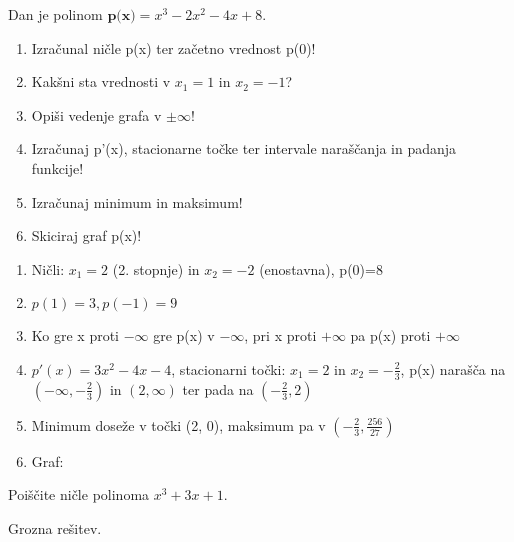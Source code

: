 \begin{vaja}
  Dan je polinom $\textbf{p(x)}= x^3-2x^2-4x+8$.
\begin{enumerate}
\item Izračunal ničle p(x) ter začetno vrednost p(0)!
\item Kakšni sta vrednosti v $x_1=1$ in $x_2=-1$?
\item Opiši vedenje grafa v $\pm \infty$!
\item Izračunaj p'(x), stacionarne točke ter intervale naraščanja in padanja funkcije!
\item Izračunaj minimum in maksimum!
\item Skiciraj graf p(x)!
\end{enumerate}

  \begin{odgovor}
    \begin{enumerate}
\item Ničli: $x_1=2$ (2. stopnje) in $x_2=-2$ (enostavna), p(0)=8
\item $p(1)=3, p(-1)=9$
\item Ko gre x proti $-\infty$ gre p(x) v $-\infty$, pri x proti $+\infty$ pa p(x) proti $+\infty$
\item $p'(x)=3x^2-4x-4$, stacionarni točki: $x_1=2$ in $x_2=-\frac{2}{3}$, p(x) narašča na $(-\infty, -\frac{2}{3})$  in $(2, \infty)$ ter pada na $(-\frac{2}{3}, 2)$
\item Minimum doseže v točki (2, 0), maksimum pa v $(-\frac{2}{3}, \frac{256}{27})$
\item Graf:
\end{enumerate}
  \end{odgovor}
\end{vaja}
\begin{vaja}
  Poiščite ničle polinoma $x^3 + 3 x + 1$.

  \begin{odgovor}
    Grozna rešitev.
  \end{odgovor}
\end{vaja}

